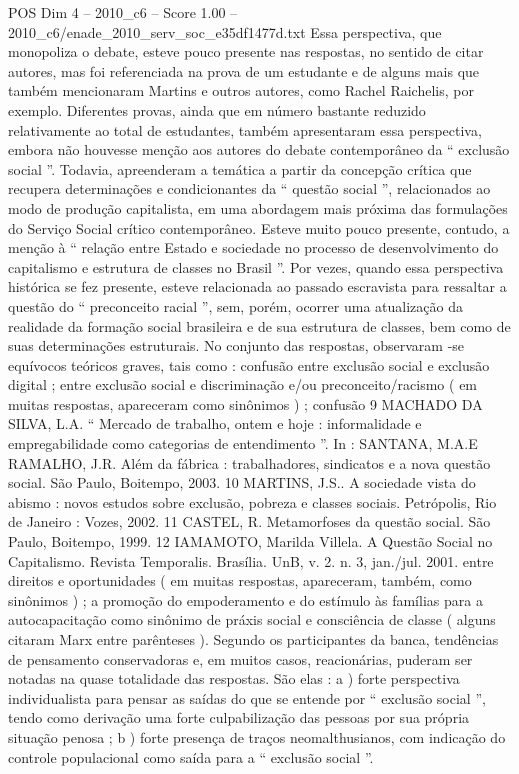 \begin{textsample}{POS Dim 4 – 2010\_c6 – Score 1.00 – 2010\_c6/enade\_2010\_serv\_soc\_e35df1477d.txt}
Essa perspectiva, que monopoliza o debate, esteve pouco presente nas respostas, no sentido de citar autores, mas foi referenciada na prova de um estudante e de alguns mais que também mencionaram Martins e outros autores, como Rachel Raichelis, por exemplo.
Diferentes provas, ainda que em número bastante reduzido relativamente ao total de estudantes, também apresentaram essa perspectiva, embora não houvesse menção aos autores do debate contemporâneo da “ exclusão social ”.
Todavia, apreenderam a temática a partir da concepção crítica que recupera determinações e condicionantes da “ questão social ”, relacionados ao modo de produção capitalista, em uma abordagem mais próxima das formulações do Serviço Social crítico contemporâneo.
Esteve muito pouco presente, contudo, a menção à “ relação entre Estado e sociedade no processo de desenvolvimento do capitalismo e estrutura de classes no Brasil ”.
Por vezes, quando essa perspectiva histórica se fez presente, esteve relacionada ao passado escravista para ressaltar a questão do “ preconceito racial ”, sem, porém, ocorrer uma atualização da realidade da formação social brasileira e de sua estrutura de classes, bem como de suas determinações estruturais.
No conjunto das respostas, observaram -se equívocos teóricos graves, tais como : confusão entre exclusão social e exclusão digital ; entre exclusão social e discriminação e/ou preconceito/racismo ( em muitas respostas, apareceram como sinônimos ) ; confusão 9 MACHADO DA SILVA, L.A. “ Mercado de trabalho, ontem e hoje : informalidade e empregabilidade como categorias de entendimento ”.
In : SANTANA, M.A.E RAMALHO, J.R.
Além da fábrica : trabalhadores, sindicatos e a nova questão social.
São Paulo, Boitempo, 2003. 10 MARTINS, J.S..
A sociedade vista do abismo : novos estudos sobre exclusão, pobreza e classes sociais.
Petrópolis, Rio de Janeiro : Vozes, 2002. 11 CASTEL, R.
Metamorfoses da questão social.
São Paulo, Boitempo, 1999. 12 IAMAMOTO, Marilda Villela.
A Questão Social no Capitalismo.
Revista Temporalis.
Brasília.
UnB, v. 2. n. 3, jan./jul. 2001. entre direitos e oportunidades ( em muitas respostas, apareceram, também, como sinônimos ) ; a promoção do empoderamento e do estímulo às famílias para a autocapacitação como sinônimo de práxis social e consciência de classe ( alguns citaram Marx entre parênteses ).
Segundo os participantes da banca, tendências de pensamento conservadoras e, em muitos casos, reacionárias, puderam ser notadas na quase totalidade das respostas.
São elas : a ) forte perspectiva individualista para pensar as saídas do que se entende por “ exclusão social ”, tendo como derivação uma forte culpabilização das pessoas por sua própria situação penosa ; b ) forte presença de traços neomalthusianos, com indicação do controle populacional como saída para a “ exclusão social ”.

\end{textsample}
